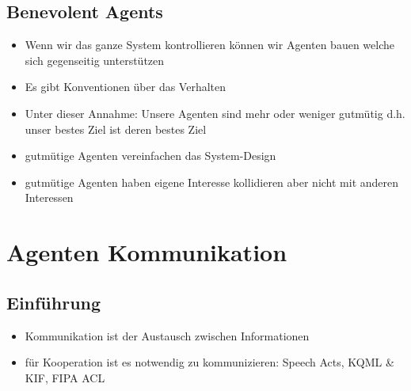 \documentclass{article} %
\begin{document}
	\subsection{Benevolent Agents}
	\begin{itemize}
		\item Wenn wir das ganze System kontrollieren können wir Agenten bauen welche sich gegenseitig unterstützen
		\item Es gibt Konventionen über das Verhalten
		\item Unter dieser Annahme: Unsere Agenten sind mehr oder weniger gutmütig d.h. unser bestes Ziel ist deren bestes Ziel
		\item gutmütige Agenten vereinfachen das System-Design
		\item gutmütige Agenten haben eigene Interesse kollidieren aber nicht mit anderen Interessen
	\end{itemize}
\section{Agenten Kommunikation}
	\subsection{Einführung}
	\begin{itemize}
		\item Kommunikation ist der Austausch zwischen Informationen
		\item für Kooperation ist es notwendig zu kommunizieren: Speech Acts, KQML \& KIF, FIPA ACL
	\end{itemize}
\end{document}
